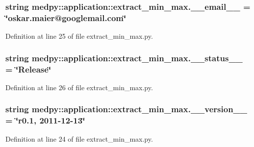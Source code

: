 \hypertarget{namespacemedpy_1_1application_1_1extract__min__max_a66f81613de11ea8bb8caa16ef678fdd5}{
\subsubsection[{\_\-\_\-email\_\-\_\-}]{\setlength{\rightskip}{0pt plus 5cm}string {\bf medpy::application::extract\_\-min\_\-max.\_\-\_\-email\_\-\_\-} = \char`\"{}oskar.maier@googlemail.com\char`\"{}}}
\label{namespacemedpy_1_1application_1_1extract__min__max_a66f81613de11ea8bb8caa16ef678fdd5}


Definition at line 25 of file extract\_\-min\_\-max.py.

\hypertarget{namespacemedpy_1_1application_1_1extract__min__max_a2c1c69b200edd40a8a5613c0668b327b}{
\subsubsection[{\_\-\_\-status\_\-\_\-}]{\setlength{\rightskip}{0pt plus 5cm}string {\bf medpy::application::extract\_\-min\_\-max.\_\-\_\-status\_\-\_\-} = \char`\"{}Release\char`\"{}}}
\label{namespacemedpy_1_1application_1_1extract__min__max_a2c1c69b200edd40a8a5613c0668b327b}


Definition at line 26 of file extract\_\-min\_\-max.py.

\hypertarget{namespacemedpy_1_1application_1_1extract__min__max_aad1839ca4455eae95fe7005102947390}{
\subsubsection[{\_\-\_\-version\_\-\_\-}]{\setlength{\rightskip}{0pt plus 5cm}string {\bf medpy::application::extract\_\-min\_\-max.\_\-\_\-version\_\-\_\-} = \char`\"{}r0.1, 2011-\/12-\/13\char`\"{}}}
\label{namespacemedpy_1_1application_1_1extract__min__max_aad1839ca4455eae95fe7005102947390}


Definition at line 24 of file extract\_\-min\_\-max.py.

